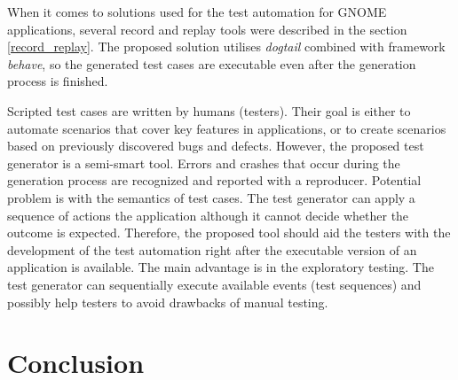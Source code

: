 When it comes to solutions used for the test automation for GNOME applications, several record and replay tools were described in the section \ref{record_replay}. The proposed solution utilises \textit{dogtail} combined with framework \textit{behave}, so the generated test cases are executable even after the generation process is finished.

Scripted test cases are written by humans (testers). Their goal is either to automate scenarios that cover key features in applications, or to create scenarios based on previously discovered bugs and defects. However, the proposed test generator is a semi-smart tool. Errors and crashes that occur during the generation process are recognized and reported with a reproducer. Potential problem is with the semantics of test cases. The test generator can apply a sequence of actions the application although it cannot decide whether the outcome is expected. Therefore, the proposed tool should aid the testers with the development of the test automation right after the executable version of an application is available. The main advantage is in the exploratory testing. The test generator can sequentially execute available events (test sequences) and possibly help testers to avoid drawbacks of manual testing.


\chapter{Conclusion}
